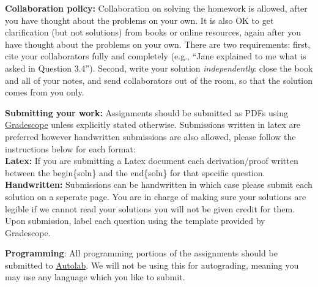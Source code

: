 \documentclass{article}
\begin{document}
\begin{itemize*}
\item \textbf{Collaboration policy:} Collaboration on solving the homework is allowed, after you have thought about the problems on your own.  It is also OK to get clarification (but not solutions) from books or online resources, again after you have thought about the problems on your own.  There are two requirements: first, cite your collaborators fully and completely (e.g., ``Jane explained to me what is asked in Question 3.4'').  Second, write your solution {\em independently}: close the book and all of your notes, and send collaborators out of the room, so that the solution comes from you only.

\vspace{0.1in}
\item\textbf{Submitting your work:} Assignments should be submitted as PDFs using \href{https://gradescope.com/}{Gradescope} unless explicitly stated otherwise.  Submissions written in latex are preferred however handwritten submissions are also allowed, please follow the instructions below for each format:\\
\textbf{Latex:} If you are submitting a Latex document each derivation/proof written between the begin\{soln\} and the end\{soln\} for that specific question. \\
\textbf{Handwritten:} Submissions can be handwritten in which case please submit each solution on a seperate page. You are in charge of making sure your solutions are legible if we cannot read your solutions you will not be given credit for them.\\
Upon submission, label each question using the template provided by Gradescope. 

\vspace{0.1in}
\item \textbf{Programming}: All programming portions of the assignments should be submitted to \href{https://autolab.andrew.cmu.edu/courses/10701-f18/assessments}{Autolab}.  We will not be using this for autograding, meaning you may use any language which you like to submit.
\end{itemize*}

\newpage
\end{document}
